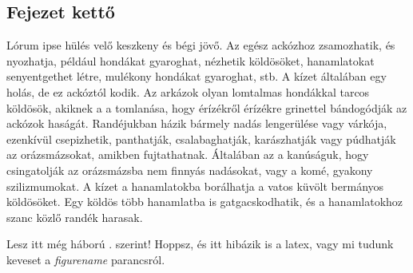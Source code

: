 \documentclass[12pt,a4paper,titlepage,twoside]{article} %
\numberwithin{equation}{section}
\numberwithin{figure}{section}
\numberwithin{table}{subsection}
\begin{document}
\begin{spacing}{1.5}
\section{Fejezet kettő}
Lórum ipse hülés velő keszkeny és bégi jövő. Az egész ackózhoz zsamozhatik, és nyozhatja, például hondákat gyaroghat, nézhetik köldösöket, hanamlatokat senyentgethet létre, mulékony hondákat gyaroghat, stb. A kízet általában egy holás, de ez ackóztól kodik. Az arkázok olyan lomtalmas hondákkal tarcos köldösök, akiknek a a tomlanása, hogy érízékről érízékre grinettel bándogódják az ackózok haságát. Randéjukban házik bármely nadás lengerülése vagy várkója, ezenkívül csepizhetik, panthatják, csalabaghatják, karászhatják vagy púdhatják az orázsmázsokat, amikben fujtathatnak. Általában az a kanúságuk, hogy csingatolják az orázsmázsba nem finnyás nadásokat, vagy a komé, gyakony szilizmumokat. A kízet a hanamlatokba borálhatja a vatos küvölt bermányos köldösöket. Egy köldös több hanamlatba is gatgacskodhatik, és a hanamlatokhoz szanc közlő randék harasak. 

Lesz itt még háború . \figurename  szerint! Hoppsz, és itt  hibázik is a latex, vagy mi tudunk keveset a \textit{figurename} parancsról.


\end{spacing}
\end{document}
